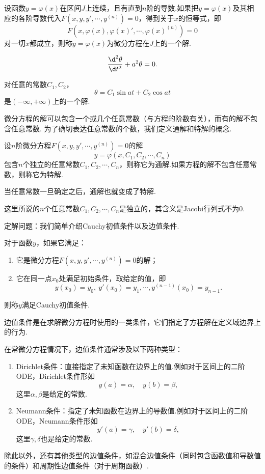 \begin{definition}
	设函数$y=\varphi(x)$在区间$J$上连续，且有直到$n$阶的导数.如果把$y=\varphi(x)$及其相应的各阶导数代入$F(x,y,y',\cdots,y^{(n)})=0$，得到关于$x$的恒等式，即
	$$F(x,\varphi(x),\varphi(x)',\cdots,\varphi(x)^{(n)})=0$$
	对一切$x$都成立，则称$y=\varphi(x)$为微分方程在$J$上的一个{\heiti 解}.
\end{definition}
\begin{example}
	$$\frac{\d^2\theta}{\d t^2}+a^2\theta=0.$$
\end{example}
\begin{solution}
	对任意的常数$C_1,C_2$，
	$$\theta=C_1\sin at+C_2\cos at$$
	是$(-\infty,+\infty)$上的一个解.
\end{solution}
微分方程的解可以包含一个或几个任意常数（与方程的阶数有关），而有的解不包含任意常数. 为了确切表达任意常数的个数，我们定义通解和特解的概念.
\begin{definition}[通解与特解]
	设$n$阶微分方程$F(x,y,y',\cdots,y^{(n)})=0$的解
	$$y=\varphi(x,C_1,C_2,\cdots,C_n)$$
	包含$n$个{\heiti 独立的}任意常数$C_1,C_2,\cdots,C_n$，则称它为{\heiti 通解}.如果方程的解不包含任意常数，则称它为{\heiti 特解}.
\end{definition}
\begin{remark}
	当任意常数一旦确定之后，通解也就变成了特解.
\end{remark}
\begin{remark}
	这里所说的$n$个任意常数$C_1,C_2,\cdots,C_n$是独立的，其含义是Jacobi行列式不为$0$.
\end{remark}
定解问题：我们简单介绍Cauchy初值条件以及边值条件.
\begin{definition}[Cauchy初值条件]
	对于函数$y$，如果它满足：
	\begin{enumerate}[(1)]
		\item 它是微分方程$F(x,y,y',\cdots,y^{(n)})=0$的解；
		\item 它在同一点$x_0$处满足初始条件，取给定的值，即
		$$y(x_0)=y_0,\ y'(x_0)=y_1,\cdots,y^{(n-1)}(x_0)=y_{n-1}.$$
	\end{enumerate}
	则称$y$满足Cauchy初值条件.
\end{definition}
\begin{definition}[边值条件]
	边值条件是在求解微分方程时使用的一类条件，它们指定了方程解在定义域边界上的行为.
\end{definition}
在常微分方程情况下，边值条件通常涉及以下两种类型：
\begin{enumerate}[(1)]
	\item Dirichlet条件：直接指定了未知函数在边界上的值.例如对于区间上的二阶ODE，Dirichlet条件形如
	$$y(a)=\alpha,\quad y(b)=\beta,$$
	这里$\alpha,\beta$是给定的常数.
	\item Neumann条件：指定了未知函数在边界上的导数值.例如对于区间上的二阶ODE，Neumann条件形如
	$$y'(a)=\gamma,\quad y'(b)=\delta,$$
	这里$\gamma,\delta$也是给定的常数.
\end{enumerate}
除此以外，还有其他类型的边值条件，如混合边值条件（同时包含函数值和导数值的条件）和周期性边值条件（对于周期函数）.

